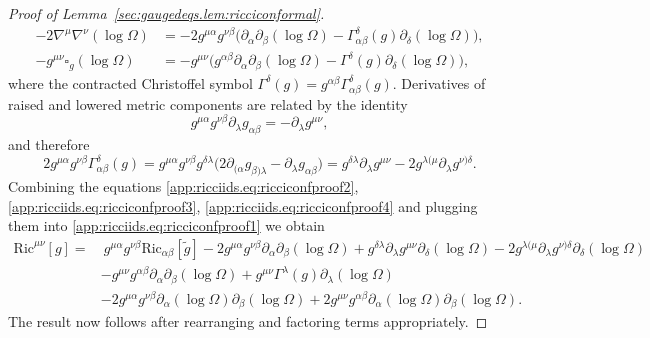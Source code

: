 \documentclass{article}
\newcommand{\Ric}{\mathrm{Ric}}
\newcommand{\wt}{\widetilde}
\newcommand{\pa}{\partial}
\begin{document}
\begin{proof}[Proof of Lemma~\ref{sec:gaugedeqs.lem:ricciconformal}]
    \begin{subequations}
        \begin{align}
            -2\nabla^\mu\nabla^\nu (\log \Omega) &= -2g^{\mu\alpha}g^{\nu\beta}\big(\pa_\alpha\pa_\beta (\log \Omega) - \Gamma_{\alpha\beta}^\delta(g)\pa_\delta (\log \Omega)\big),\label{app:ricciids.eq:ricciconfproof2}\\
            -g^{\mu\nu}\square_g (\log\Omega) &= -g^{\mu\nu}\big(g^{\alpha\beta}\pa_\alpha\pa_\beta (\log \Omega) - \Gamma^\delta(g)\pa_\delta (\log\Omega)\big),\label{app:ricciids.eq:ricciconfproof3}
        \end{align}
    \end{subequations}
    where the contracted Christoffel symbol $\Gamma^\delta(g) = g^{\alpha\beta}\Gamma_{\alpha\beta}^\delta(g)$. Derivatives of raised and lowered metric components are related by the identity
    \begin{equation}\label{app:ricciids.eq:diffmetidentity}
        g^{\mu\alpha}g^{\nu\beta} \pa_\lambda g_{\alpha\beta} = - \pa_\lambda g^{\mu\nu},
    \end{equation}
    and therefore
    \begin{equation}\label{app:ricciids.eq:ricciconfproof4}
        2g^{\mu\alpha}g^{\nu\beta}\Gamma_{\alpha\beta}^\delta(g) = g^{\mu\alpha}g^{\nu\beta}g^{\delta\lambda}\big(2\pa_{(\alpha} g_{\beta)\lambda} - \pa_\lambda g_{\alpha\beta}\big) = g^{\delta\lambda}\pa_\lambda g^{\mu\nu}- 2g^{\lambda(\mu}\pa_\lambda g^{\nu) \delta}.
    \end{equation}
    Combining the equations \eqref{app:ricciids.eq:ricciconfproof2}, \eqref{app:ricciids.eq:ricciconfproof3}, \eqref{app:ricciids.eq:ricciconfproof4} and plugging them into \eqref{app:ricciids.eq:ricciconfproof1} we obtain
    \begin{align}
        \Ric^{\mu\nu}[g] =&\> g^{\mu\alpha}g^{\nu\beta}\Ric_{\alpha\beta}[\wt{g}]-2g^{\mu\alpha}g^{\nu\beta}\pa_\alpha\pa_\beta (\log \Omega) + g^{\delta\lambda}\pa_\lambda g^{\mu\nu}\pa_\delta (\log \Omega)- 2g^{\lambda(\mu}\pa_\lambda g^{\nu)\delta}\pa_\delta (\log \Omega) \nonumber\\
        &- g^{\mu\nu} g^{\alpha\beta}\pa_\alpha\pa_\beta (\log\Omega) + g^{\mu\nu}\Gamma^{\lambda}(g)\pa_\lambda (\log \Omega)\nonumber\\
        &- 2g^{\mu\alpha}g^{\nu\beta}\pa_\alpha(\log\Omega)\pa_\beta(\log\Omega) + 2g^{\mu\nu}g^{\alpha\beta}\pa_\alpha (\log \Omega)\pa_\beta(\log\Omega).
    \end{align}
    The result now follows after rearranging and factoring terms appropriately.
\end{proof}
\end{document}
